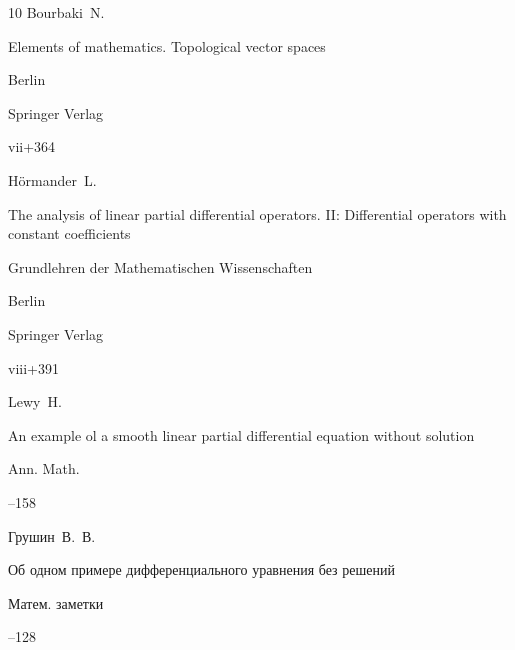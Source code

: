 \begin{thebibliography}{10}
\by Bourbaki~N.

\book  Elements of mathematics. Topological vector spaces


\publaddr Berlin 

\publ Springer Verlag

\totalpages vii+364 







\by H\"ormander~L.

\book The analysis of linear partial differential operators\rm. II: Differential operators with constant coefficients


\serial Grundlehren der Mathematischen Wissenschaften


\publaddr Berlin

\publ Springer Verlag

\totalpages viii+391 





\by Lewy~H. 

\paper An example ol a smooth linear partial differential equation without solution

\jour Ann. Math.





--158






\by Грушин~В.~В.

\paper Об одном примере дифференциального уравнения без решений

\jour Матем. заметки




--128




\end{thebibliography}
